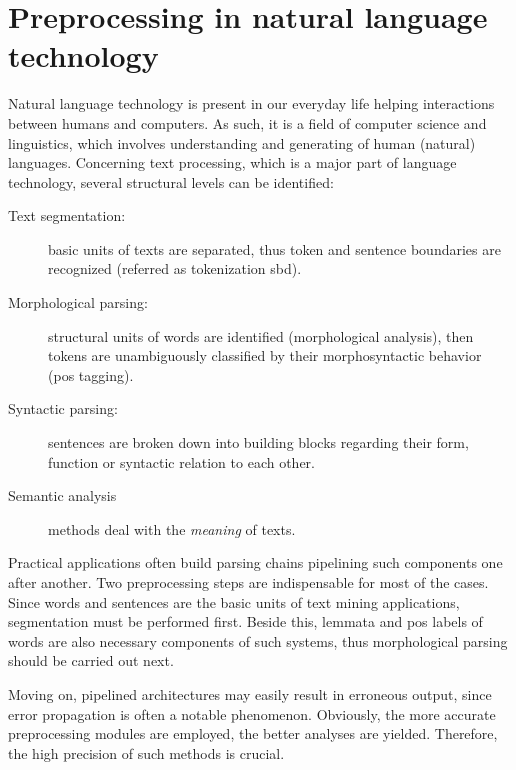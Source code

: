 \section{Preprocessing in natural language technology}



Natural language technology is present in our everyday life helping interactions between humans and computers.
As such, it is a field of computer science and linguistics, which involves understanding and generating of human (natural) languages.
Concerning text processing, which is a major part of language technology, several structural levels can be identified:
\begin{description}
\item[Text segmentation:] basic units of texts are separated, thus token  and sentence boundaries are recognized (referred as tokenization \gls{sbd}).
\item[Morphological parsing:] structural units of words are identified (morphological analysis), then tokens are unambiguously classified by their morphosyntactic behavior (\acrlong{pos} tagging).
\item[Syntactic parsing:] sentences are broken down into building blocks regarding their form, function or syntactic relation to each other.
\item[Semantic analysis] methods deal with the \emph{meaning} of texts.
\end{description}

Practical applications often build parsing chains pipelining such components one after another. 
Two preprocessing steps are indispensable for most of the cases.
Since words and sentences are the basic units of text mining applications, segmentation must be performed first.
Beside this, lemmata and \gls{pos} labels of words are also necessary components of such systems, thus morphological parsing should be carried out next.

Moving on, pipelined architectures may easily result in erroneous output, since error propagation is often a notable phenomenon. 
Obviously, the more accurate preprocessing modules are employed, the better analyses are yielded. Therefore, the high precision of such methods is crucial.

